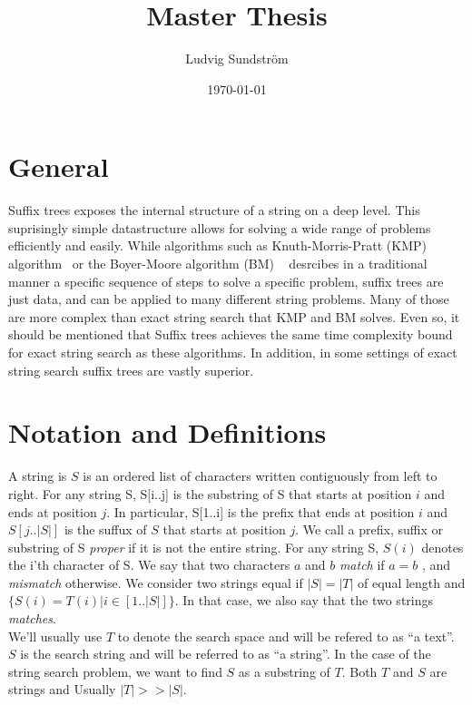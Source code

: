 \documentclass[a4paper]{article}
\title{Master Thesis}
\author{Ludvig Sundstr\"{o}m}
\date{\today}
\begin{document}
\maketitle

\section{General}

Suffix trees exposes the internal structure of a string on a deep level. This
suprisingly simple datastructure allows for solving a wide range of problems
efficiently and easily. While algorithms such as Knuth-Morris-Pratt (KMP)
algorithm~\cite{website:knp-wiki} or the Boyer-Moore algorithm (BM)
~\cite{website:bm-wiki} desrcibes in a traditional manner a specific sequence of
steps to solve a specific problem, suffix trees are just data, and can be
applied to many different string problems. Many of those are more complex than
exact string search that KMP and BM solves. Even so, it should be mentioned that
Suffix trees achieves the same time complexity bound for exact string search as
these algorithms. In addition, in some settings of exact string search suffix
trees are vastly superior.

\section{Notation and Definitions}

A string is $S$ is an ordered list of characters written contiguously from left
to right. For any string S, S[i..j] is the substring of S that starts at
position $i$ and ends at position $j$. In particular, S[1..i] is the prefix that
ends at position $i$ and $S[j..|S|]$ is the suffux of $S$ that starts at
position $j$. We call a prefix, suffix or substring of S \textit{proper} if it is not
the entire string. For any string S, $S(i)$ denotes the i'th character of S. We
say that two characters $a$ and $b$ \textit{match} if $a = b$ , and
\textit{mismatch} otherwise. We consider two strings equal if $|S| = |T|$
of equal length and $\{ S(i) = T(i) | i \in [1..|S|]\}$. In that case, we also
say that the two strings \textit{matches}.
\\
We'll usually use $T$ to denote the search space and will be refered to as ``a
text''. $S$ is the search string and will be referred to as ``a string''. In the
case of the string search problem, we want to find $S$ as a substring of
$T$. Both $T$ and $S$ are strings and Usually $|T| >> |S|$.
\end{document}
